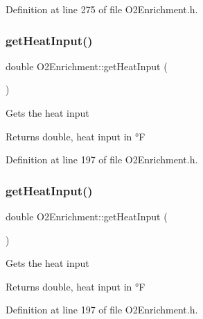 Definition at line 275 of file O2\+Enrichment.\+h.

\mbox{\label{class_o2_enrichment_a3a9fb23728ab5831e47cb5aafb438439}} 
\subsubsection{\texorpdfstring{get\+Heat\+Input()}{getHeatInput()}\hspace{0.1cm}{\footnotesize\ttfamily [1/3]}}
{\footnotesize\ttfamily double O2\+Enrichment\+::get\+Heat\+Input (\begin{DoxyParamCaption}{ }\end{DoxyParamCaption})\hspace{0.3cm}{\ttfamily [inline]}}

Gets the heat input \begin{DoxyReturn}{Returns}
double, heat input in °F 
\end{DoxyReturn}


Definition at line 197 of file O2\+Enrichment.\+h.

\mbox{\label{class_o2_enrichment_a3a9fb23728ab5831e47cb5aafb438439}} 
\subsubsection{\texorpdfstring{get\+Heat\+Input()}{getHeatInput()}\hspace{0.1cm}{\footnotesize\ttfamily [2/3]}}
{\footnotesize\ttfamily double O2\+Enrichment\+::get\+Heat\+Input (\begin{DoxyParamCaption}{ }\end{DoxyParamCaption})\hspace{0.3cm}{\ttfamily [inline]}}

Gets the heat input \begin{DoxyReturn}{Returns}
double, heat input in °F 
\end{DoxyReturn}


Definition at line 197 of file O2\+Enrichment.\+h.

\mbox{\label{class_o2_enrichment_a3a9fb23728ab5831e47cb5aafb438439}} 
